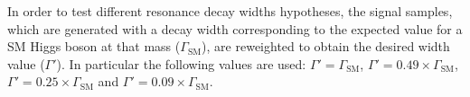 In order to test different resonance decay widths hypotheses, the signal samples, which are generated with a decay width corresponding to the expected value for a SM Higgs boson at that mass ($\Gamma_\mathrm{SM}$), are reweighted to obtain the desired width value ($\Gamma'$). In particular the following values are used: $\Gamma' = \Gamma_\mathrm{SM}$, $\Gamma' = 0.49 \times \Gamma_\mathrm{SM}$, $\Gamma' = 0.25 \times \Gamma_\mathrm{SM}$ and $\Gamma' = 0.09 \times \Gamma_\mathrm{SM}$.




